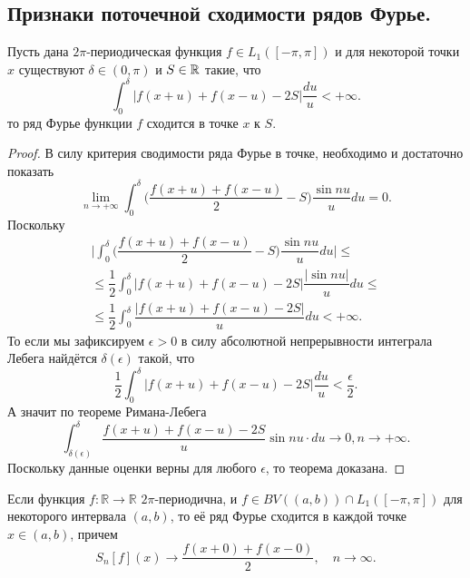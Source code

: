 \subsection{Признаки поточечной сходимости рядов Фурье.}
\begin{theorem}
	Пусть дана $2\pi$-периодическая функция $f \in L_1([-\pi, \pi])$ и для некоторой точки $x$ существуют $\delta \in (0, \pi)$ и $S \in \mathbb{R}$ такие, что \[
																																							\int_0^\delta |f(x + u) + f(x - u) - 2S|\dfrac{du}{u} < +\infty.
	\]
	то ряд Фурье функции $f$ сходится в точке $x$ к $S$.
\end{theorem}
\begin{proof}
	В силу критерия сводимости ряда Фурье в точке, необходимо и достаточно показать \[
																						\lim\limits_{n \rightarrow +\infty} \int_0^\delta \biggr(\dfrac{f(x + u) + f(x - u)}{2} - S\biggr)\dfrac{\sin nu}{u}du = 0.
	\]
	Поскольку \begin{multline*}
				  \biggr|\int_0^\delta \biggr(\dfrac{f(x + u) + f(x - u)}{2} - S\biggr)\dfrac{\sin nu}{u}du\biggr| \leq \\ \leq \dfrac{1}{2}\int_0^\delta |f(x + u) + f(x - u) - 2S|\dfrac{|\sin nu|}{u}du \leq \\ \leq \dfrac{1}{2}\int_0^\delta \dfrac{|f(x + u) + f(x - u) - 2S|}{u}du < +\infty.
	\end{multline*}
	То если мы зафиксируем $\epsilon > 0$ в силу абсолютной непрерывности интеграла Лебега найдётся $\delta(\epsilon)$ такой, что \[
																																	  \dfrac{1}{2}\int_0^\delta |f(x + u) + f(x - u) - 2S|\dfrac{du}{u} < \dfrac{\epsilon}{2}.
	\]
	А значит по теореме Римана-Лебега \[
										  \int_{\delta(\epsilon)}^\delta \dfrac{f(x + u) + f(x - u) - 2S}{u}\sin nu\cdot du \rightarrow 0, n \rightarrow +\infty.
	\]
	Поскольку данные оценки верны для любого $\epsilon$, то теорема доказана.
\end{proof}

\begin{theorem}
	Если функция $f:\mathbb{R} \to \mathbb{R}$ $2\pi$-периодична, и $f \in BV((a,b)) \cap L_{1}([-\pi,\pi])$ для некоторого интервала $(a,b)$, то её ряд Фурье сходится в каждой точке $x \in (a,b)$, причем
	$$
	S_{n}[f](x) \to \frac{f(x+0)+f(x-0)}{2}, \quad n \to \infty.
	$$
\end{theorem}

